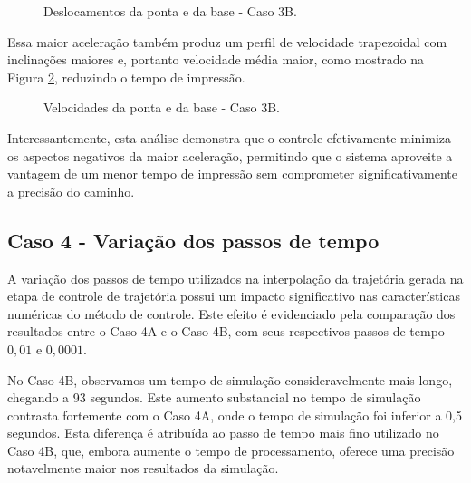 \begin{figure}[H]
    \centering
    \hfill
    \caption{Deslocamentos da ponta e da base - Caso 3B.}
    \label{fig:3B_des}
\end{figure}

Essa maior aceleração também produz um perfil de velocidade trapezoidal com inclinações maiores e, portanto velocidade média maior, como mostrado na Figura \ref{fig:3B_vel}, reduzindo o tempo de impressão.

\begin{figure}[H]
    \centering
    \hfill
    \caption{Velocidades da ponta e da base - Caso 3B.}
    \label{fig:3B_vel}
\end{figure}

Interessantemente, esta análise demonstra que o controle efetivamente minimiza os aspectos negativos da maior aceleração, permitindo que o sistema aproveite a vantagem de um menor tempo de impressão sem comprometer significativamente a precisão do caminho.


\subsection{Caso 4 - Variação dos passos de tempo}

A variação dos passos de tempo utilizados na interpolação da trajetória gerada na etapa de controle de trajetória possui um impacto significativo nas características numéricas do método de controle. Este efeito é evidenciado pela comparação dos resultados entre o Caso 4A e o Caso 4B, com seus respectivos passos de tempo \(0,01\) e \(0,0001\).

No Caso 4B, observamos um tempo de simulação consideravelmente mais longo, chegando a 93 segundos. Este aumento substancial no tempo de simulação contrasta fortemente com o Caso 4A, onde o tempo de simulação foi inferior a 0,5 segundos. Esta diferença é atribuída ao passo de tempo mais fino utilizado no Caso 4B, que, embora aumente o tempo de processamento, oferece uma precisão notavelmente maior nos resultados da simulação.

